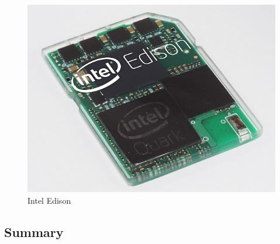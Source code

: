 \begin{figure}[H]
\includegraphics{images/intel-edison-560}

\protect\caption{Intel Edison}


\end{figure}

\subsection{Summary}


